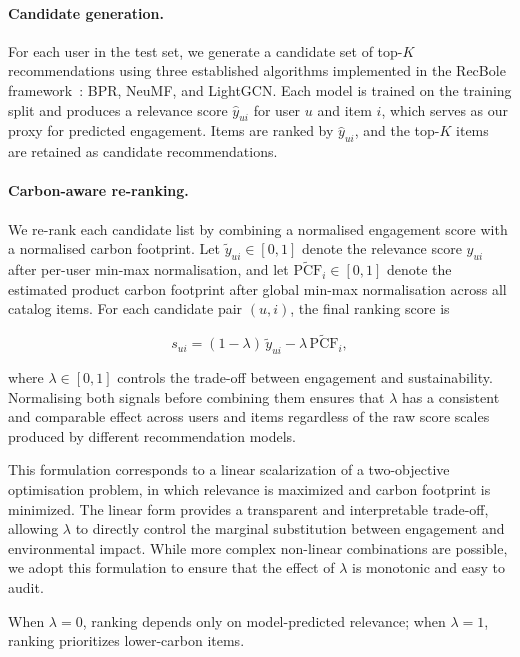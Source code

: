 \documentclass[11pt]{article}
\begin{document}
\paragraph{Candidate generation.}
For each user in the test set, we generate a candidate set of top-$K$ recommendations
using three established algorithms implemented in the RecBole framework~\cite{recbole2021}:
BPR, NeuMF, and LightGCN. Each model is trained on the training split and produces a
relevance score $\hat{y}_{ui}$ for user $u$ and item $i$, which serves as our proxy for
predicted engagement. Items are ranked by $\hat{y}_{ui}$, and the top-$K$ items are
retained as candidate recommendations.

\paragraph{Carbon-aware re-ranking.}
We re-rank each candidate list by combining a normalised engagement score with a normalised
carbon footprint. Let $\tilde{y}_{ui} \in [0,1]$ denote the relevance score
$\hat{y}_{ui}$ after per-user min-max normalisation, and let $\widetilde{\mathrm{PCF}}_i
\in [0,1]$ denote the estimated product carbon footprint after global min-max normalisation
across all catalog items. For each candidate pair $(u,i)$, the final ranking score is

\begin{equation}
s_{ui} = (1 - \lambda)\, \tilde{y}_{ui} - \lambda \, \widetilde{\mathrm{PCF}}_i,
\end{equation}

where $\lambda \in [0,1]$ controls the trade-off between engagement and sustainability.
Normalising both signals before combining them ensures that $\lambda$ has a consistent and
comparable effect across users and items regardless of the raw score scales produced by
different recommendation models. 

This formulation corresponds to a linear scalarization of a two-objective optimisation
problem, in which relevance is maximized and carbon footprint is minimized. The linear form
provides a transparent and interpretable trade-off, allowing $\lambda$ to directly control
the marginal substitution between engagement and environmental impact. While more complex
non-linear combinations are possible, we adopt this formulation to ensure that the effect of
$\lambda$ is monotonic and easy to audit.

When $\lambda = 0$, ranking depends only on model-predicted relevance; when $\lambda = 1$,
ranking prioritizes lower-carbon items.
\end{document}
